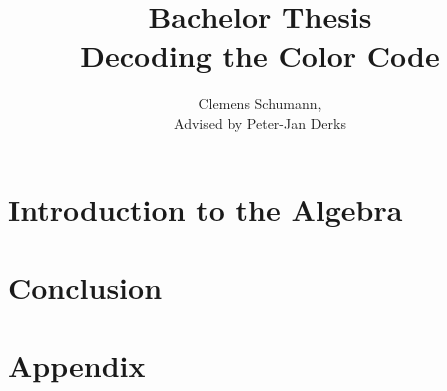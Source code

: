 \documentclass[12pt]{article}
\title{Bachelor Thesis\\ Decoding the Color Code}
\author{Clemens Schumann, \\
Advised by Peter-Jan Derks}
\begin{document}
\maketitle
\newpage
\tableofcontents
\newpage
%
\section{Introduction to the Algebra}


\newpage
\section{Conclusion}

\newpage
\section{Appendix}

\newpage
%
%
\end{document}
